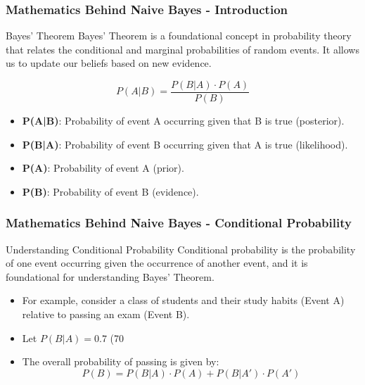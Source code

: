 \documentclass[aspectratio=169]{beamer}
\begin{document}
\begin{frame}[fragile]
    \frametitle{Mathematics Behind Naive Bayes - Introduction}
    \begin{block}{Bayes' Theorem}
        Bayes' Theorem is a foundational concept in probability theory that relates the conditional and marginal probabilities of random events. It allows us to update our beliefs based on new evidence.
    \end{block}
    
    \begin{equation}
    P(A|B) = \frac{P(B|A) \cdot P(A)}{P(B)}
    \end{equation}
    
    \begin{itemize}
        \item \textbf{P(A|B)}: Probability of event A occurring given that B is true (posterior).
        \item \textbf{P(B|A)}: Probability of event B occurring given that A is true (likelihood).
        \item \textbf{P(A)}: Probability of event A (prior).
        \item \textbf{P(B)}: Probability of event B (evidence).
    \end{itemize}
\end{frame}

\begin{frame}[fragile]
    \frametitle{Mathematics Behind Naive Bayes - Conditional Probability}
    \begin{block}{Understanding Conditional Probability}
        Conditional probability is the probability of one event occurring given the occurrence of another event, and it is foundational for understanding Bayes' Theorem.
    \end{block}
    
    \begin{itemize}
        \item For example, consider a class of students and their study habits (Event A) relative to passing an exam (Event B).
        \item Let \( P(B|A) = 0.7 \) (70%
        \item The overall probability of passing is given by:
        \begin{equation}
        P(B) = P(B|A) \cdot P(A) + P(B|A') \cdot P(A')
        \end{equation}
    \end{itemize}
\end{frame}
\end{document}
